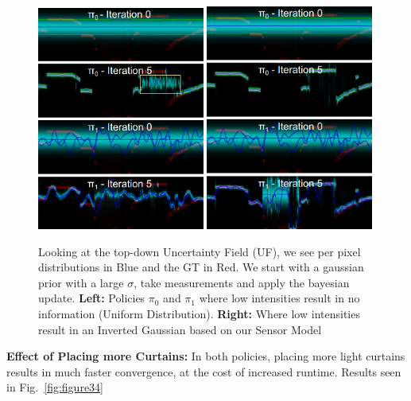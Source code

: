  \begin{figure}[h]
    \centering
    \begin{minipage}{0.5\textwidth}
        \centering
        \includegraphics[width=0.49\textwidth]{figures/InvGau.png}
        \includegraphics[width=0.49\textwidth]{figures/Uniform.png}
    \end{minipage}\hfill
    \centering
    \caption{Looking at the top-down Uncertainty Field (UF), we see per pixel distributions in Blue and the GT in Red. We start with a gaussian prior with a large $\sigma$, take measurements and apply the bayesian update. \textbf{Left:} Policies $\pi_{0}$ and $\pi_{1}$ where low intensities result in no information (Uniform Distribution). \textbf{Right:} Where low intensities result in an Inverted Gaussian based on our Sensor Model}
    \label{fig:invgau} 
\end{figure}

 \textbf{Effect of Placing more Curtains:} In both policies, placing more light curtains results in much faster convergence, at the cost of increased runtime. Results seen in Fig.~\ref{fig:figure34}

